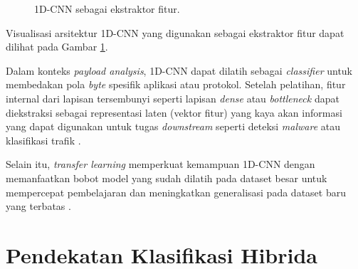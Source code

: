 \begin{figure}[h!]
    \centering
    \caption{1D-CNN sebagai ekstraktor fitur.}
    \label{fig:bab2_1-cnn}
\end{figure}

Visualisasi arsitektur 1D-CNN yang digunakan sebagai ekstraktor fitur dapat dilihat pada Gambar \ref{fig:bab2_1-cnn}.

Dalam konteks \textit{payload analysis}, 1D-CNN dapat dilatih sebagai \textit{classifier} untuk membedakan pola \textit{byte} spesifik aplikasi atau protokol. Setelah pelatihan, fitur internal dari lapisan tersembunyi seperti lapisan \textit{dense} atau \textit{bottleneck} dapat diekstraksi sebagai representasi laten (vektor fitur) yang kaya akan informasi yang dapat digunakan untuk tugas \textit{downstream} seperti deteksi \textit{malware} atau klasifikasi trafik \citep{nie2025iot, AlFayoumi2022}.

Selain itu, \textit{transfer learning} memperkuat kemampuan 1D-CNN dengan memanfaatkan bobot model yang sudah dilatih pada dataset besar untuk mempercepat pembelajaran dan meningkatkan generalisasi pada dataset baru yang terbatas \citep{Stein2024, nie2025iot}.

\section{Pendekatan Klasifikasi Hibrida}

